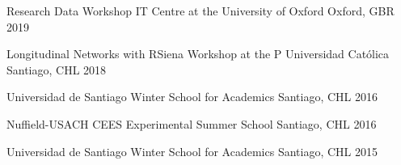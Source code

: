 






\begin{cvhonors}
\cvconf
{Research Data Workshop IT Centre at the University of Oxford} 
{Oxford, GBR}
{2019}
\end{cvhonors}

\vspace{1mm}

\begin{cvhonors}
\cvconf
{Longitudinal Networks with RSiena Workshop at the P Universidad Cat\'olica}
{Santiago, CHL}
{2018}
\end{cvhonors}

\vspace{1mm}

\begin{cvhonors}
\cvconf
{Universidad de Santiago Winter School for Academics}
{Santiago, CHL}
{2016}
\end{cvhonors}

\vspace{1mm}

\begin{cvhonors}
\cvconf
{Nuffield-USACH CEES Experimental Summer School}
{Santiago, CHL}
{2016}
\end{cvhonors}

\vspace{1mm}

\begin{cvhonors}
\cvconf
{Universidad de Santiago Winter School for Academics}
{Santiago, CHL}
{2015}
\end{cvhonors}

